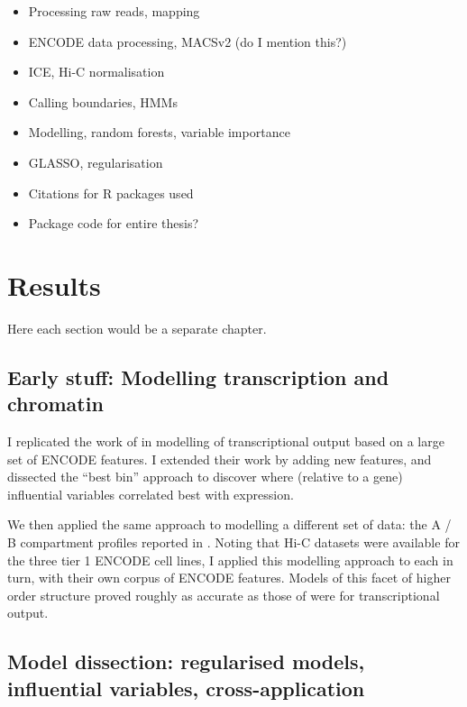 \documentclass[a4paper,10pt,oneside]{book}
\begin{document}
\begin{itemize}
\itemsep1pt\parskip0pt
\item
  Processing raw reads, mapping
\item
  ENCODE data processing, MACSv2 (do I mention this?)
\item
  ICE, Hi-C normalisation
\item
  Calling boundaries, HMMs
\item
  Modelling, random forests, variable importance
\item
  GLASSO, regularisation
\item
  Citations for R packages used
\item
  Package code for entire thesis?
\end{itemize}

\chapter{Results}

Here each section would be a separate chapter.

\section{\textbf{Early stuff:} Modelling transcription and
chromatin}\label{early-stuff-modelling-transcription-and-chromatin}

I replicated the work of \citet{Dong2012} in modelling of
transcriptional output based on a large set of ENCODE features. I
extended their work by adding new features, and dissected the ``best
bin'' approach to discover where (relative to a gene) influential
variables correlated best with expression.

We then applied the same approach to modelling a different set of data:
the A / B compartment profiles reported in \citet{Lieberman2011}. Noting
that Hi-C datasets were available for the three tier 1 ENCODE cell
lines, I applied this modelling approach to each in turn, with their own
corpus of ENCODE features. Models of this facet of higher order structure
proved roughly as accurate as those of \citet{Dong2012} were for
transcriptional output.

\section{\textbf{Model dissection}: regularised models, influential
variables,
cross-application}\label{model-dissection-regularised-models-influential-variables-cross-application}
\end{document}
